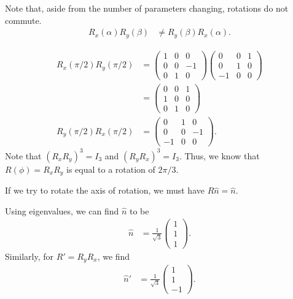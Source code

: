 \documentclass[10pt]{mypackage}
\begin{document}
Note that, aside from the number of parameters changing, rotations do not commute.
\begin{align*}
  R_x\left(\alpha\right)R_y\left(\beta\right) &\neq R_y\left(\beta\right)R_x\left(\alpha\right).
\end{align*}
\begin{example}
  \begin{align*}
    R_x\left(\pi/2\right)R_y\left(\pi/2\right) &= \begin{pmatrix}1 & 0 & 0\\ 0 & 0 & -1 \\ 0 & 1 & 0\end{pmatrix} \begin{pmatrix}0 & 0 & 1\\ 0 & 1 & 0 \\ -1 & 0 & 0\end{pmatrix}\\
                                               &= \begin{pmatrix}0 & 0 & 1 \\ 1 & 0 & 0 \\ 0 & 1 & 0\end{pmatrix}\\
    R_y\left(\pi/2\right)R_x\left(\pi/2\right) &= \begin{pmatrix}0 & 1 & 0 \\ 0 & 0 & -1 \\ -1 & 0 & 0\end{pmatrix}.
  \end{align*}
  Note that $\left(R_xR_y\right)^3 = I_3$ and $\left(R_yR_x\right)^3 = I_3$. Thus, we know that $R\left(\phi\right) = R_xR_y$ is equal to a rotation of $2\pi/3$.\newline

  If we try to rotate the axis of rotation, we must have $R\widehat{n} = \widehat{n}$.\newline

  Using eigenvalues, we can find $\widehat{n}$ to be
  \begin{align*}
    \widehat{n} &= \frac{1}{\sqrt{3}} \begin{pmatrix}1\\1\\1\end{pmatrix}.
  \end{align*}
  Similarly, for $R' = R_yR_x$, we find
  \begin{align*}
    \widehat{n}' &= \frac{1}{\sqrt{3}}\begin{pmatrix}1\\1\\-1\end{pmatrix}.
  \end{align*}
\end{example}
\end{document}
